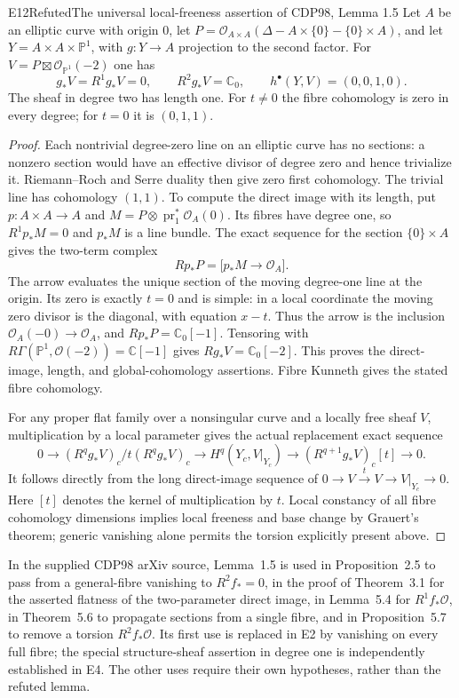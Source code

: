 \begin{statement}{E12}{Refuted}{The universal local-freeness assertion of CDP98, Lemma 1.5}
Let $A$ be an elliptic curve with origin $0$, let
$P=\mathcal O_{A\times A}(\Delta-A\times\{0\}-\{0\}\times A)$,
and let $Y=A\times A\times\mathbb P^1$, with $g:Y\to A$
projection to the second factor. For
$V=P\boxtimes\mathcal O_{\mathbb P^1}(-2)$ one has
\[
 g_*V=R^1g_*V=0,\qquad R^2g_*V=\mathbb C_0,
 \qquad h^\bullet(Y,V)=(0,0,1,0).
\]
The sheaf in degree two has length one. For $t\ne0$ the fibre
cohomology is zero in every degree; for $t=0$ it is $(0,1,1)$.
\end{statement}
\begin{proof}
Each nontrivial degree-zero line on an elliptic curve has no
sections: a nonzero section would have an effective divisor of
degree zero and hence trivialize it. Riemann--Roch and Serre
duality then give zero first cohomology. The trivial line has
cohomology $(1,1)$. To compute the direct image with its length,
put $p:A\times A\to A$ and $M=P\otimes\operatorname{pr}_1^*
\mathcal O_A(0)$. Its fibres have degree one, so
$R^1p_*M=0$ and $p_*M$ is a line bundle. The exact sequence for
the section $\{0\}\times A$ gives the two-term complex
\[
 Rp_*P=\bigl[p_*M\longrightarrow\mathcal O_A\bigr].
\]
The arrow evaluates the unique section of the moving degree-one
line at the origin. Its zero is exactly $t=0$ and is simple:
in a local coordinate the moving zero divisor is the diagonal,
with equation $x-t$. Thus the arrow is the inclusion
$\mathcal O_A(-0)\to\mathcal O_A$, and
$Rp_*P=\mathbb C_0[-1]$. Tensoring with
$R\Gamma(\mathbb P^1,\mathcal O(-2))=\mathbb C[-1]$
gives $Rg_*V=\mathbb C_0[-2]$. This proves the direct-image,
length, and global-cohomology assertions. Fibre Kunneth gives
the stated fibre cohomology.

For any proper flat family over a nonsingular curve and a locally
free sheaf $V$, multiplication by a local parameter gives the
actual replacement exact sequence
\[
0\to (R^qg_*V)_c/t(R^qg_*V)_c
 \to H^q(Y_c,V|_{Y_c})
 \to (R^{q+1}g_*V)_c[t]\to0.
\]
It follows directly from the long direct-image sequence of
$0\to V\xrightarrow{t}V\to V|_{Y_c}\to0$. Here $[t]$ denotes
the kernel of multiplication by $t$. Local constancy of all
fibre cohomology dimensions implies local freeness and base
change by Grauert's theorem; generic vanishing alone permits
the torsion explicitly present above.
\end{proof}

In the supplied CDP98 arXiv source, Lemma~1.5 is used in
Proposition~2.5 to pass from a general-fibre vanishing to
$R^2f_*=0$, in the proof of Theorem~3.1 for the asserted
flatness of the two-parameter direct image, in Lemma~5.4 for
$R^1f_*\mathcal O$, in Theorem~5.6 to propagate sections from a
single fibre, and in Proposition~5.7 to remove a torsion
$R^2f_*\mathcal O$. Its first use is replaced in E2 by vanishing
on every full fibre; the special structure-sheaf assertion in
degree one is independently established in E4. The other uses
require their own hypotheses, rather than the refuted lemma.


